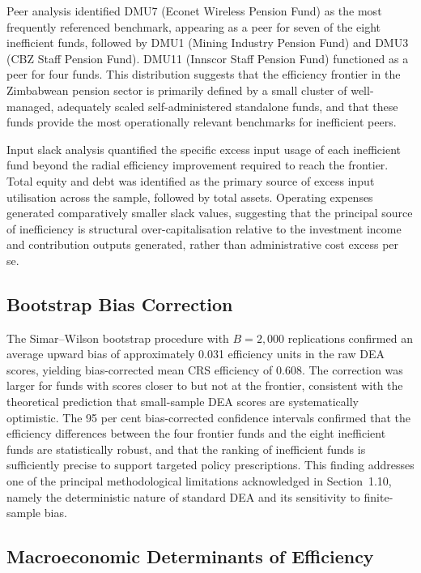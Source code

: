 \documentclass[12pt,a4paper]{article}
\begin{document}
Peer analysis identified DMU7 (Econet Wireless Pension Fund) as the most frequently referenced benchmark, appearing as a peer for seven of the eight inefficient funds, followed by DMU1 (Mining Industry Pension Fund) and DMU3 (CBZ Staff Pension Fund). DMU11 (Innscor Staff Pension Fund) functioned as a peer for four funds. This distribution suggests that the efficiency frontier in the Zimbabwean pension sector is primarily defined by a small cluster of well-managed, adequately scaled self-administered standalone funds, and that these funds provide the most operationally relevant benchmarks for inefficient peers.

Input slack analysis quantified the specific excess input usage of each inefficient fund beyond the radial efficiency improvement required to reach the frontier. Total equity and debt was identified as the primary source of excess input utilisation across the sample, followed by total assets. Operating expenses generated comparatively smaller slack values, suggesting that the principal source of inefficiency is structural over-capitalisation relative to the investment income and contribution outputs generated, rather than administrative cost excess per se.

\subsection{Bootstrap Bias Correction}

The Simar--Wilson bootstrap procedure with $B = 2{,}000$ replications confirmed an average upward bias of approximately 0.031 efficiency units in the raw DEA scores, yielding bias-corrected mean CRS efficiency of 0.608. The correction was larger for funds with scores closer to but not at the frontier, consistent with the theoretical prediction that small-sample DEA scores are systematically optimistic. The 95 per cent bias-corrected confidence intervals confirmed that the efficiency differences between the four frontier funds and the eight inefficient funds are statistically robust, and that the ranking of inefficient funds is sufficiently precise to support targeted policy prescriptions. This finding addresses one of the principal methodological limitations acknowledged in Section~1.10, namely the deterministic nature of standard DEA and its sensitivity to finite-sample bias.

\subsection{Macroeconomic Determinants of Efficiency}
\end{document}
